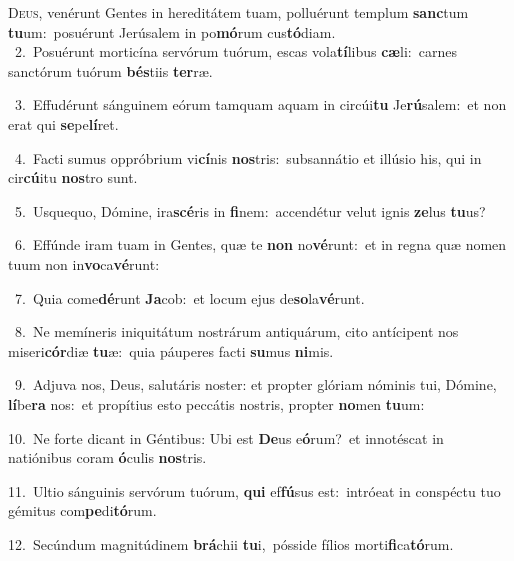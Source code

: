 \lettrine{\initial\textcolor{\initialcolor}{D}}{eus,} venérunt Gentes in hereditátem tuam, polluérunt templum \textbf{sanc}\-tum \textbf{tu}\-um:~\star posuérunt Jerúsalem in po\-\textbf{mó}\-rum cus\-\textbf{tó}\-diam.\\
{\numbfont\textcolor{\numbcolor}{~2.}}~Posuérunt morticína servórum tuórum, escas vola\-\textbf{tí}\-libus \textbf{cæ}\-li:~\star carnes sanctórum tuórum \textbf{bés}\-tiis \textbf{ter}\-ræ.\par
{\numbfont\textcolor{\numbcolor}{~3.}}~Effudérunt sánguinem eórum tamquam aquam in circúi\textbf{tu} Je\-\textbf{rú}\-salem:~\star et non erat qui \textbf{se}\-pe\-\textbf{lí}\-ret.\par
{\numbfont\textcolor{\numbcolor}{~4.}}~Facti sumus oppróbrium vi\-\textbf{cí}\-nis \textbf{nos}\-tris:~\star subsannátio et illúsio his, qui in cir\-\textbf{cú}\-itu \textbf{nos}\-tro sunt.\par
{\numbfont\textcolor{\numbcolor}{~5.}}~Usquequo, Dómine, ira\-\textbf{scé}\-ris in \textbf{fi}\-nem:~\star accendétur velut ignis \textbf{ze}\-lus \textbf{tu}\-us?\par
{\numbfont\textcolor{\numbcolor}{~6.}}~Effúnde iram tuam in Gentes, quæ te \textbf{non} no\-\textbf{vé}\-runt:~\star et in regna quæ nomen tuum non in\-\textbf{vo}\-ca\-\textbf{vé}\-runt:\par
{\numbfont\textcolor{\numbcolor}{~7.}}~Quia come\-\textbf{dé}\-runt \textbf{Ja}\-cob:~\star et locum ejus de\-\textbf{so}\-la\-\textbf{vé}\-runt.\par
{\numbfont\textcolor{\numbcolor}{~8.}}~Ne memíneris iniquitátum nostrárum antiquárum, cito antícipent nos miseri\-\textbf{cór}\-diæ \textbf{tu}\-æ:~\star quia páuperes facti \textbf{su}\-mus \textbf{ni}\-mis.\par
{\numbfont\textcolor{\numbcolor}{~9.}}~Adjuva nos, Deus, salutáris noster: et propter glóriam nóminis tui, Dómine, \textbf{lí}\-be\textbf{ra} nos:~\star et propítius esto peccátis nostris, propter \textbf{no}\-men \textbf{tu}\-um:\par
{\numbfont\textcolor{\numbcolor}{10.}}~Ne forte dicant in Géntibus: Ubi est \textbf{De}\-us e\-\textbf{ó}\-rum?~\star et innotéscat in natiónibus coram \textbf{ó}\-culis \textbf{nos}\-tris.\par
{\numbfont\textcolor{\numbcolor}{11.}}~Ultio sánguinis servórum tuórum, \textbf{qui} ef\-\textbf{fú}\-sus est:~\star intróeat in conspéctu tuo gémitus com\-\textbf{pe}\-di\-\textbf{tó}\-rum.\par
{\numbfont\textcolor{\numbcolor}{12.}}~Secúndum magnitúdinem \textbf{brá}\-chii \textbf{tu}\-i,~\star pósside fílios morti\-\textbf{fi}\-ca\-\textbf{tó}\-rum.\par
